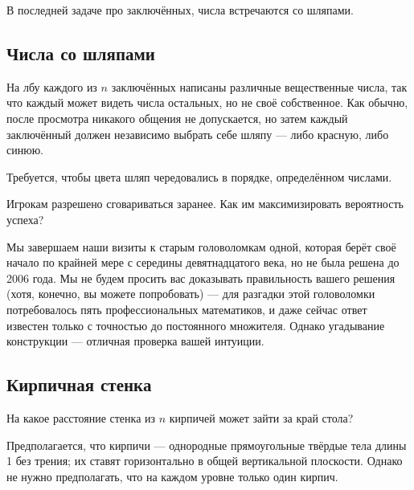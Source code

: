 \medskip

В последней задаче про заключённых, числа встречаются со шляпами. 

\subsection*{Числа со шляпами}

На лбу каждого из $n$ заключённых написаны различные вещественные числа, так что каждый может видеть числа остальных, но не своё собственное.
Как обычно, после просмотра никакого общения не допускается, но затем каждый заключённый должен независимо выбрать себе шляпу --- либо красную, либо синюю.

Требуется, чтобы цвета шляп чередовались в порядке, определённом числами.

Игрокам разрешено сговариваться заранее.
Как им максимизировать вероятность успеха?

\medskip

Мы завершаем наши визиты к старым головоломкам одной, которая берёт своё начало по крайней мере с середины девятнадцатого века, но не была решена до 2006 года.
Мы не будем просить вас доказывать правильность вашего решения (хотя, конечно, вы можете попробовать) --- для разгадки этой головоломки потребовалось пять профессиональных математиков, и даже сейчас ответ известен только с точностью до постоянного множителя.
Однако угадывание конструкции --- отличная проверка вашей интуиции.

\subsection*{Кирпичная стенка}\label{Кирпичная стенка}

На какое расстояние стенка из $n$ кирпичей может зайти за край стола?

 Предполагается, что кирпичи --- однородные прямоугольные твёрдые тела длины 1 без трения;
их ставят горизонтально в общей вертикальной плоскости.
Однако не нужно предполагать, что на каждом уровне только один кирпич.
